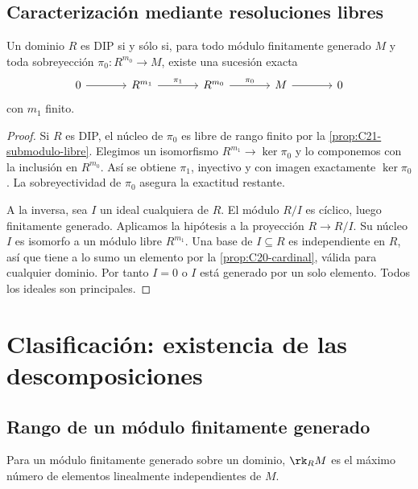 \subsection{Caracterización mediante resoluciones libres}
\begin{prop}\label{prop:C21-resoluciones}
Un dominio $R$ es DIP si y sólo si, para todo módulo finitamente generado $M$ y toda sobreyección $\pi_0:R^{m_0}\to M$, existe una sucesión exacta
\[
\begin{tikzcd}[column sep=large]
0\arrow[r]&R^{m_1}\arrow[r,"\pi_1"]&R^{m_0}\arrow[r,"\pi_0"]&M\arrow[r]&0
\end{tikzcd}
\]
con $m_1$ finito.
\end{prop}
\begin{proof}
Si $R$ es DIP, el núcleo de $\pi_0$ es libre de rango finito por la \cref{prop:C21-submodulo-libre}. Elegimos un isomorfismo $R^{m_1}\to\ker\pi_0$ y lo componemos con la inclusión en $R^{m_0}$. Así se obtiene $\pi_1$, inyectivo y con imagen exactamente $\ker\pi_0$. La sobreyectividad de $\pi_0$ asegura la exactitud restante.

A la inversa, sea $I$ un ideal cualquiera de $R$. El módulo $R/I$ es cíclico, luego finitamente generado. Aplicamos la hipótesis a la proyección $R\to R/I$. Su núcleo $I$ es isomorfo a un módulo libre $R^{m_1}$. Una base de $I\subseteq R$ es independiente en $R$, así que tiene a lo sumo un elemento por la \cref{prop:C20-cardinal}, válida para cualquier dominio. Por tanto $I=0$ o $I$ está generado por un solo elemento. Todos los ideales son principales.
\end{proof}

\section{Clasificación: existencia de las descomposiciones}
\subsection{Rango de un módulo finitamente generado}
\begin{defi}
Para un módulo finitamente generado sobre un dominio, $\rk_R M$ es el máximo número de elementos linealmente independientes de $M$.
\end{defi}

